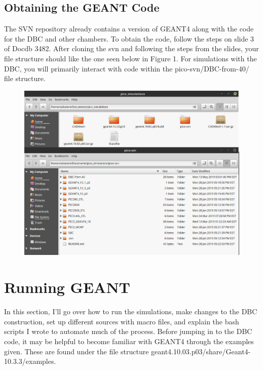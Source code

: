 \documentclass[%
12pt,
twoside,
reprint,
amsmath,amssymb,
aps,
]{article}
\begin{document}
	\subsection{Obtaining the GEANT Code}
	\par The SVN repository already contains a version of GEANT4 along with the code for the DBC and other chambers. To obtain the code, follow the steps on slide 3 of Docdb 3482. After cloning the svn and following the steps from the slides, your file structure should like the one seen below in Figure 1. For simulations with the DBC, you will primarily interact with code within the pico-svn/DBC-from-40/ file structure.
	
	\begin{figure}[!b]
		\includegraphics[scale = 0.65]{Images/svn_file_structure_test.png}
		\caption{\label{tab:table-name}}
	\end{figure}
	
	\section{Running GEANT}
	\par In this section, I'll go over how to run the simulations, make changes to the DBC construction, set up different sources with macro files, and explain the bash scripts I wrote to automate much of the process. Before jumping in to the DBC code, it may be helpful to become familiar with GEANT4 through the examples given. These are found under the file structure geant4.10.03.p03/share/Geant4-10.3.3/examples.
	
\end{document}
